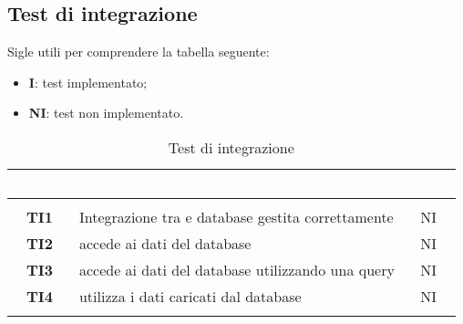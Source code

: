 \subsection{Test di integrazione}
Sigle utili per comprendere la tabella seguente:
\begin{itemize}
	\item \textbf{I}: test implementato;
	\item \textbf{NI}: test non implementato.
\end{itemize} 

\renewcommand{\arraystretch}{1.5}
\renewcommand\extrarowheight{1.5pt}
\begin{longtable}{ c|C{12cm}|c } 
		\textcolor{white}{\textbf{Codice}} & 
		\textcolor{white}{\textbf{Descrizione}} & 
		\textcolor{white}{\textbf{Stato}} \\
		\endfirsthead
		\\
	    \endfoot
	    \endlastfoot

\textbf{TI1} & 
Integrazione tra \NomeProgetto{} e database gestita correttamente & 
NI\\

\textbf{TI2} & 
\NomeProgetto{} accede ai dati del database & 
NI\\

\textbf{TI3} & 
\NomeProgetto{} accede ai dati del database utilizzando una query & 
NI\\

\textbf{TI4} & 
\NomeProgetto{} utilizza i dati caricati dal database & 
NI\\

\caption{Test di integrazione}
\label{testIntegrazione}
\end{longtable}